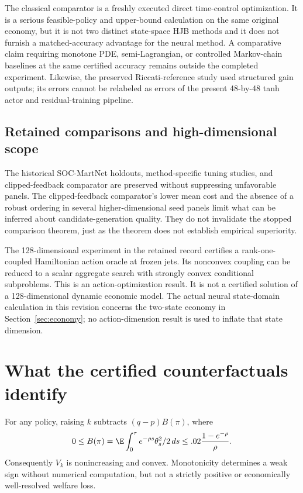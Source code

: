 The classical comparator is a freshly executed direct time-control optimization. It is a serious feasible-policy and upper-bound calculation on the same original economy, but it is not two distinct state-space HJB methods and it does not furnish a matched-accuracy advantage for the neural method. A comparative claim requiring monotone PDE, semi-Lagrangian, or controlled Markov-chain baselines at the same certified accuracy remains outside the completed experiment. Likewise, the preserved Riccati-reference study used structured gain outputs; its errors cannot be relabeled as errors of the present 48-by-48 tanh actor and residual-training pipeline.

\subsection{Retained comparisons and high-dimensional scope}
The historical SOC-MartNet holdouts, method-specific tuning studies, and clipped-feedback comparator are preserved without suppressing unfavorable panels. The clipped-feedback comparator's lower mean cost and the absence of a robust ordering in several higher-dimensional seed panels limit what can be inferred about candidate-generation quality. They do not invalidate the stopped comparison theorem, just as the theorem does not establish empirical superiority.

The 128-dimensional experiment in the retained record certifies a rank-one-coupled Hamiltonian action oracle at frozen jets. Its nonconvex coupling can be reduced to a scalar aggregate search with strongly convex conditional subproblems. This is an action-optimization result. It is not a certified solution of a 128-dimensional dynamic economic model. The actual neural state-domain calculation in this revision concerns the two-state economy in Section~\ref{sec:economy}; no action-dimension result is used to inflate that state dimension.

\section{What the certified counterfactuals identify}\label{sec:economics}
For any policy, raising $k$ subtracts $(q-p)B(\pi)$, where
\[
 0\leq B(\pi)=\E\int_0^\tau e^{-\rho s}\theta_s^2/2\,ds
 \leq .02\frac{1-e^{-\rho}}{\rho}.
\]
Consequently $V_k$ is nonincreasing and convex. Monotonicity determines a weak sign without numerical computation, but not a strictly positive or economically well-resolved welfare loss.

